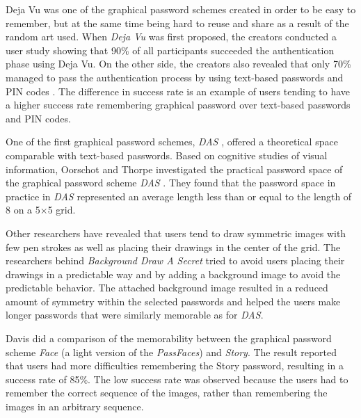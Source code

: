     Deja Vu was one of the graphical password schemes created in order to be easy to remember, but at the same time being hard to reuse and share as a result of the random art used. When {\it Deja Vu} was first proposed, the creators conducted a user study showing that 90\% of all participants succeeded the authentication phase using Deja Vu. On the other side, the creators also revealed that only 70\% managed to pass the authentication process by using text-based passwords and PIN codes \cite{DejaVu}. The difference in success rate is an example of users tending to have a higher success rate remembering graphical password over text-based passwords and PIN codes. 

    One of the first graphical password schemes, {\it DAS} \cite{Jermyn}, offered a theoretical space comparable with text-based passwords. Based on cognitive studies of visual information, Oorschot and Thorpe \cite{Thorpe1} investigated the practical password space of the graphical password scheme {\it DAS} \cite{Jermyn}. They found that the password space in practice in {\it DAS} represented an average length less than or equal to the length of 8 on a 5$\times$5 grid. 

    Other researchers have revealed that users tend to draw symmetric images with few pen strokes as well as placing their drawings in the center of the grid. The researchers behind {\it Background Draw A Secret}\cite{BDAS} tried to avoid users placing their drawings in a predictable way and by adding a background image to avoid the predictable behavior. The attached background image resulted in a reduced amount of symmetry within the selected passwords and helped the users make longer passwords that were similarly memorable as for {\it DAS}.

    Davis \cite{Davis} did a comparison of the memorability between the graphical password scheme {\it Face} (a light version of the {\it PassFaces}) and {\it Story}. The result reported that users had more difficulties remembering the Story password, resulting in a success rate of  85\%. The low success rate was observed because the users had to remember the correct sequence of the images, rather than remembering the images in an arbitrary sequence. 


